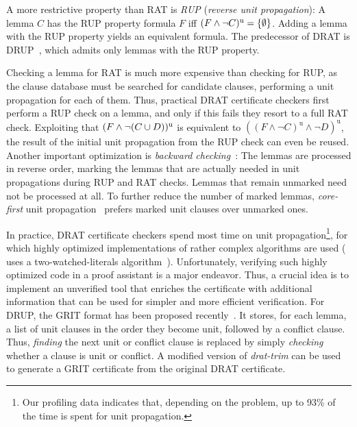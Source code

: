 \documentclass[smallcondensed]{svjour3}     %
\begin{document}

A more restrictive property than RAT is \emph{RUP} (\emph{reverse unit propagation}): A lemma $C$ has the RUP property \wrt formula $F$ iff $(F \wedge \neg C)^{\textrm u} = \{\emptyset\}$.
Adding a lemma with the RUP property yields an equivalent formula. The predecessor of DRAT is DRUP~\cite{HHW13}, which admits only lemmas with the RUP property.

Checking a lemma for RAT is much more expensive than checking for RUP, as the clause database must be searched for candidate clauses,
performing a unit propagation for each of them. Thus, practical DRAT certificate checkers first perform a RUP check on a lemma, and only if 
this fails they resort to a full RAT check. Exploiting that $(F\wedge\neg(C\cup D))^\textrm{u}$ is equivalent to $((F \wedge \neg C)^\textrm{u} \wedge \neg D)^\textrm{u}$,
the result of the initial unit propagation from the RUP check can even be reused.
Another important optimization is \emph{backward checking}~\cite{GoNo03,HHW13}: The lemmas are processed in reverse order, marking the lemmas that are actually needed 
in unit propagations during RUP and RAT checks. Lemmas that remain unmarked need not be processed at all. To further reduce the number of marked lemmas, 
\emph{core-first} unit propagation~\cite{WHH14} prefers marked unit clauses over unmarked ones.

In practice, DRAT certificate checkers spend most time on unit propagation\footnote{Our profiling data indicates that, depending on the problem, up to 93\% of the time is spent for unit propagation.}, for which highly optimized implementations of rather complex algorithms 
are used ( uses a two-watched-literals algorithm~\cite{MMZZ01}).
Unfortunately, verifying such highly optimized code in a proof assistant is a major endeavor.
Thus, a crucial idea is to implement an unverified tool that enriches the certificate with additional information that can be used for simpler and more efficient verification.
For DRUP, the GRIT format has been proposed recently~\cite{CMS17}. 
It stores, for each lemma, a list of unit clauses in the order they become unit, followed by a conflict clause.
Thus, \emph{finding} the next unit or conflict clause is replaced by 
simply \emph{checking} whether a clause is unit or conflict. A modified version of {\sl drat-trim} can be used to generate a GRIT certificate from the original DRAT certificate.
\end{document}
